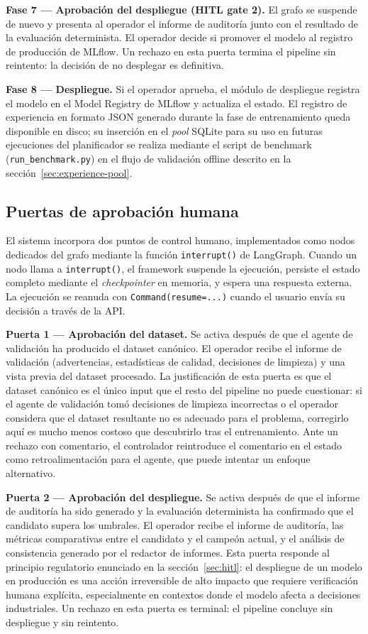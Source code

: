 \textbf{Fase 7 --- Aprobación del despliegue (HITL gate 2).} El grafo se suspende de nuevo y presenta al operador el informe de auditoría junto con el resultado de la evaluación determinista. El operador decide si promover el modelo al registro de producción de MLflow. Un rechazo en esta puerta termina el pipeline sin reintento: la decisión de no desplegar es definitiva.

\textbf{Fase 8 --- Despliegue.} Si el operador aprueba, el módulo de despliegue registra el modelo en el Model Registry de MLflow y actualiza el estado. El registro de experiencia en formato JSON generado durante la fase de entrenamiento queda disponible en disco; su inserción en el \emph{pool} SQLite para su uso en futuras ejecuciones del planificador se realiza mediante el script de benchmark (\texttt{run\_benchmark.py}) en el flujo de validación offline descrito en la sección~\ref{sec:experience-pool}.


\subsection{Puertas de aprobación humana}
\label{sec:hitl-gates}

El sistema incorpora dos puntos de control humano, implementados como nodos dedicados del grafo mediante la función \texttt{interrupt()} de LangGraph. Cuando un nodo llama a \texttt{interrupt()}, el framework suspende la ejecución, persiste el estado completo mediante el \emph{checkpointer} en memoria, y espera una respuesta externa. La ejecución se reanuda con \texttt{Command(resume=...)} cuando el usuario envía su decisión a través de la API.

\textbf{Puerta 1 --- Aprobación del dataset.} Se activa después de que el agente de validación ha producido el dataset canónico. El operador recibe el informe de validación (advertencias, estadísticas de calidad, decisiones de limpieza) y una vista previa del dataset procesado. La justificación de esta puerta es que el dataset canónico es el único input que el resto del pipeline no puede cuestionar: si el agente de validación tomó decisiones de limpieza incorrectas o el operador considera que el dataset resultante no es adecuado para el problema, corregirlo aquí es mucho menos costoso que descubrirlo tras el entrenamiento. Ante un rechazo con comentario, el controlador reintroduce el comentario en el estado como retroalimentación para el agente, que puede intentar un enfoque alternativo.

\textbf{Puerta 2 --- Aprobación del despliegue.} Se activa después de que el informe de auditoría ha sido generado y la evaluación determinista ha confirmado que el candidato supera los umbrales. El operador recibe el informe de auditoría, las métricas comparativas entre el candidato y el campeón actual, y el análisis de consistencia generado por el redactor de informes. Esta puerta responde al principio regulatorio enunciado en la sección~\ref{sec:hitl}: el despliegue de un modelo en producción es una acción irreversible de alto impacto que requiere verificación humana explícita, especialmente en contextos donde el modelo afecta a decisiones industriales. Un rechazo en esta puerta es terminal: el pipeline concluye sin despliegue y sin reintento.

